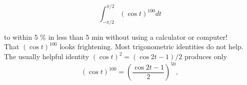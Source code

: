\documentclass{book}
\newcounter{pro1}
\begin{document}
\\ \begin{equation}
\int_{-\pi /2}^{\pi /2}(\cos t)^{100}dt
\end{equation} 
\newpage 
\pagestyle{fancy} 
\renewcommand{\headrulewidth}{0pt} 
\fancyhf{} %

\Large\textrm{to within 5 \% in less than 5 min without using a calculator or computer!\\ 
That $(\cos t)^{100}$ looks frightening. Most trigonometric identities do not 
help. The usually helpful identity $(\cos t)^{2}=(\cos 2t -1)/2$ produces only} 
\begin{equation}
(\cos t)^{100}=\left ( \frac{\cos 2t-1}{2} \right )^{50} , 
\end{equation}
\end{document}
